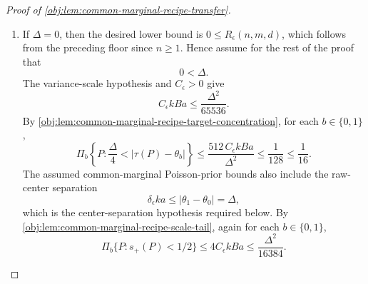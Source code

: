 \begin{proof}[Proof of \cref{obj:lem:common-marginal-recipe-transfer}]
\begin{enumerate}
\item If \(\Delta=0\), then the desired lower bound is \(0\le R_\epsilon(n,m,d)\), which follows from the preceding floor since \(n\ge1\).  Hence assume for the rest of the proof that
\[
0<\Delta.
\]
The variance-scale hypothesis and \(C_\epsilon>0\) give
\[
C_\epsilon kBa\le \frac{\Delta^2}{65536}.
\]
By \cref{obj:lem:common-marginal-recipe-target-concentration}, for each \(b\in\{0,1\}\),
\[
\Pi_b\!\left\{P:\frac{\Delta}{4}<|\tau(P)-\theta_b|\right\}
\le
\frac{512\,C_\epsilon kBa}{\Delta^2}
\le
\frac1{128}
\le
\frac1{16}.
\]
The assumed common-marginal Poisson-prior bounds also include the raw-center separation
\[
\delta_\epsilon k a\le |\theta_1-\theta_0|=\Delta,
\]
which is the center-separation hypothesis required below.
By \cref{obj:lem:common-marginal-recipe-scale-tail}, again for each \(b\in\{0,1\}\),
\[
\Pi_b\{P:s_+(P)<1/2\}
\le
4C_\epsilon kBa
\le
\frac{\Delta^2}{16384}.
\] %


\end{enumerate}
\end{proof}
